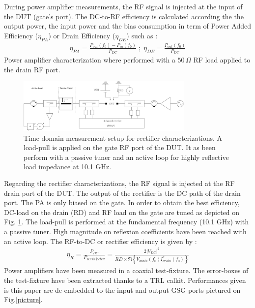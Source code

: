 \documentclass[conference]{IEEEtran}
\begin{document}
During power amplifier measurements, the RF signal is injected at the input of the DUT (gate's port). The DC-to-RF efficiency is calculated according the the output power, the input power and the bias consumption in term of Power Added Efficiency ($\eta_{PA}$) or Drain Efficiency ($\eta_{DE}$) such as :
\begin{eqnarray}
\eta_{PA}=\frac{P_{out}\left(f_0\right)-P_{in}\left(f_0\right)}{P_{DC}} \; ; \; \eta_{DE}=\frac{P_{out}\left(f_0\right)}{P_{DC}}
\end{eqnarray}
Power amplifier characterization where performed with a $50\,\Omega$ RF load applied to the drain RF port.

\begin{figure}[ht!] %
\centering
\includegraphics[width=3.4in]{IMS2014_bench.pdf}
\caption{ Time-domain measurement setup for rectifier characterizations. A load-pull is applied on the gate RF port of the DUT. It as been perform with a passive tuner and an active loop for highly reflective load impedance at 10.1 GHz.}
\label{bench}
\end{figure}

Regarding the rectifier characterizations, the RF signal is injected at the RF drain port of the DUT. The output of the rectifier is the DC path of the drain port. The PA is only biased on the gate. In order to obtain the best efficiency, DC-load on the drain (RD) and RF load on the gate are tuned as depicted on Fig. \ref{bench}. The load-pull is performed at the fundamental frequency (10.1 GHz) with a passive tuner. High magnitude on reflexion coefficients have been reached with an active loop.
The RF-to-DC or rectifier efficiency is given by :
\begin{eqnarray}
\eta_{R}=\frac{P_{DC}}{P_{RF\,injected}}=\frac{2{\left|V_{DC}\right|}^2}{RD \times \Re{\left\{V_{drain}\left(f_0\right)I^{*}_{drain}\left(f_0\right)\right\}}}
\end{eqnarray}
Power amplifiers have been measured in a coaxial test-fixture. The error-boxes of the test-fixture have been extracted thanks to a TRL calkit. Performances given is this paper are de-embedded to the input and output GSG ports pictured on Fig.\;\ref{picture}.


\end{document}
